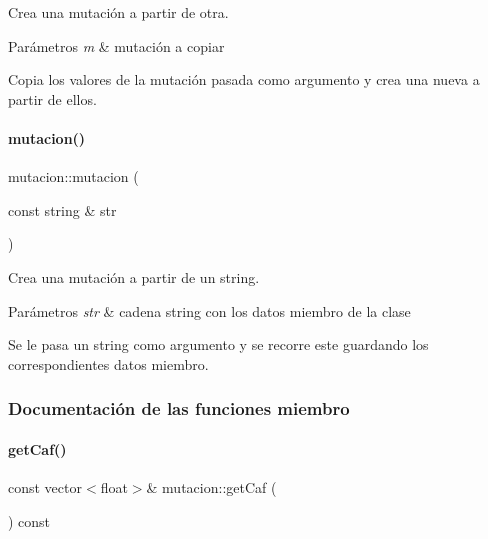 Crea una mutación a partir de otra. 


\begin{DoxyParams}{Parámetros}
{\em m} & mutación a copiar\\
\hline
\end{DoxyParams}
Copia los valores de la mutación pasada como argumento y crea una nueva a partir de ellos. \hypertarget{classmutacion_a8c5cc5b5146c511b9a1d6976156389c3}{}\label{classmutacion_a8c5cc5b5146c511b9a1d6976156389c3} 
\paragraph{\texorpdfstring{mutacion()}{mutacion()}\hspace{0.1cm}{\footnotesize\ttfamily [3/3]}}
{\footnotesize\ttfamily mutacion\+::mutacion (\begin{DoxyParamCaption}\item[{const string \&}]{str }\end{DoxyParamCaption})}



Crea una mutación a partir de un string. 


\begin{DoxyParams}{Parámetros}
{\em str} & cadena string con los datos miembro de la clase\\
\hline
\end{DoxyParams}
Se le pasa un string como argumento y se recorre este guardando los correspondientes datos miembro. 

\subsubsection{Documentación de las funciones miembro}
\hypertarget{classmutacion_a51b13ad53a652970d7983d4c21e9e73b}{}\label{classmutacion_a51b13ad53a652970d7983d4c21e9e73b} 
\paragraph{\texorpdfstring{get\+Caf()}{getCaf()}}
{\footnotesize\ttfamily const vector$<$float$>$\& mutacion\+::get\+Caf (\begin{DoxyParamCaption}{ }\end{DoxyParamCaption}) const}



